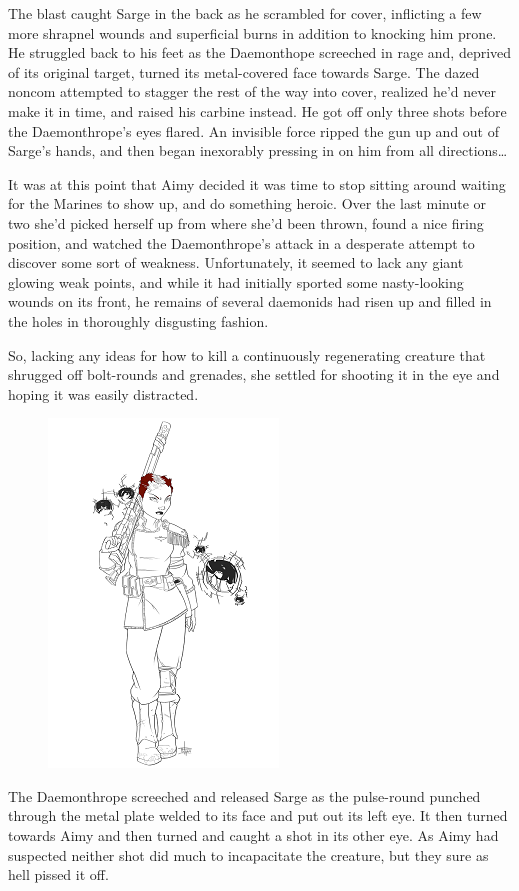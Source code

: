 The blast caught Sarge in the back as he scrambled for cover, inflicting a few more shrapnel wounds and superficial burns in addition to knocking him prone. 
He struggled back to his feet as the Daemonthope screeched in rage and, deprived of its original target, turned its metal-covered face towards Sarge. 
The dazed noncom attempted to stagger the rest of the way into cover, realized he'd never make it in time, and raised his carbine instead. 
He got off only three shots before the Daemonthrope's eyes flared. 
An invisible force ripped the gun up and out of Sarge's hands, and then began inexorably pressing in on him from all directions…

It was at this point that Aimy decided it was time to stop sitting around waiting for the Marines to show up, and do something heroic. 
Over the last minute or two she'd picked herself up from where she'd been thrown, found a nice firing position, and watched the Daemonthrope's attack in a desperate attempt to discover some sort of weakness. 
Unfortunately, it seemed to lack any giant glowing weak points, and while it had initially sported some nasty-looking wounds on its front, he remains of several daemonids had risen up and filled in the holes in thoroughly disgusting fashion. 


So, lacking any ideas for how to kill a continuously regenerating creature that shrugged off bolt-rounds and grenades, she settled for shooting it in the eye and hoping it was easily distracted.

\begin{figure}
	\begin{center}
		\includegraphics[width=\figwidth]{pics/16/52.png}
	\end{center}
\end{figure}
The Daemonthrope screeched and released Sarge as the pulse-round punched through the metal plate welded to its face and put out its left eye. 
It then turned towards Aimy and then turned and caught a shot in its other eye. 
As Aimy had suspected neither shot did much to incapacitate the creature, but they sure as hell pissed it off.

